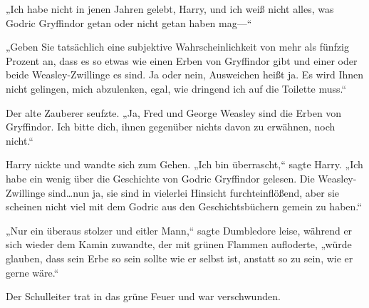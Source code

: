 „Ich habe nicht in jenen Jahren gelebt, Harry, und ich weiß nicht alles, was Godric Gryffindor getan oder nicht getan haben mag—“

„Geben Sie tatsächlich eine subjektive Wahrscheinlichkeit von mehr als fünfzig Prozent an, dass es so etwas wie einen Erben von Gryffindor gibt und einer oder beide Weasley-Zwillinge es sind. Ja oder nein, Ausweichen heißt ja. Es wird Ihnen nicht gelingen, mich abzulenken, egal, wie dringend ich auf die Toilette muss.“

Der alte Zauberer seufzte.
„Ja, Fred und George Weasley sind die Erben von Gryffindor. Ich bitte dich, ihnen gegenüber nichts davon zu erwähnen, noch nicht.“

Harry nickte und wandte sich zum Gehen.
„Ich bin überrascht,“ sagte Harry. „Ich habe ein wenig über die Geschichte von Godric Gryffindor gelesen. Die Weasley-Zwillinge sind…nun ja, sie sind in vielerlei Hinsicht furchteinflößend, aber sie scheinen nicht viel mit dem Godric aus den Geschichtsbüchern gemein zu haben.“

„Nur ein überaus stolzer und eitler Mann,“ sagte Dumbledore leise, während er sich wieder dem Kamin zuwandte, der mit grünen Flammen aufloderte, „würde glauben, dass sein Erbe so sein sollte wie er selbst ist, anstatt so zu sein, wie er gerne wäre.“

Der Schulleiter trat in das grüne Feuer und war verschwunden.


